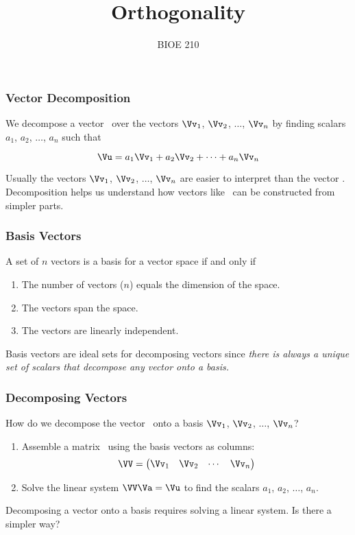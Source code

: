 \documentclass{beamer}
\title{Orthogonality}
\date{}
\author{BIOE 210}
\begin{document}
\maketitle

\begin{frame}
\frametitle{Vector Decomposition}

We decompose a vector \Vu\ over the vectors $\Vv_1$, $\Vv_2$, $\ldots$, $\Vv_n$ by finding scalars $a_1$, $a_2$, $\ldots$, $a_n$ such that

\[ \Vu = a_1\Vv_1 + a_2\Vv_2 + \cdots + a_n\Vv_n \]

Usually the vectors $\Vv_1$, $\Vv_2$, $\ldots$, $\Vv_n$ are easier to interpret than the vector \Vu. Decomposition helps us understand how vectors like \Vu\ can be constructed from simpler parts.
\end{frame}

\begin{frame}
\frametitle{Basis Vectors}

A set of $n$ vectors is a basis for a vector space if and only if
\begin{enumerate}
	\item The number of vectors ($n$) equals the dimension of the space.
	\item The vectors span the space.
	\item The vectors are linearly independent.
\end{enumerate}

Basis vectors are ideal sets for decomposing vectors since \emph{there is always a unique set of scalars that decompose any vector onto a basis.}	
\end{frame}

\begin{frame}
\frametitle{Decomposing Vectors}

How do we decompose the vector \Vu\ onto a basis $\Vv_1$, $\Vv_2$, $\ldots$, $\Vv_n$?
\begin{enumerate}
	\item Assemble a matrix \VV\ using the basis vectors as columns: 
		\[ \VV = \begin{pmatrix} \Vv_1 & \Vv_2 & \cdots & \Vv_n \end{pmatrix} \]
	\item Solve the linear system $\VV\Va = \Vu$ to find the scalars $a_1$, $a_2$, $\ldots$, $a_n$.
\end{enumerate}

Decomposing a vector onto a basis requires solving a linear system. Is there a simpler way?
\end{frame}
\end{document}
